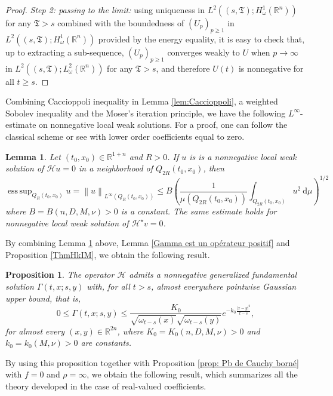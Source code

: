 \documentclass[12pt, letterpaper]{amsart}
\newtheorem{prop}[thm]{Proposition}
\newtheorem{lem}[thm]{Lemma}
\theoremstyle{definition}
\theoremstyle{remark}
\numberwithin{equation}{section}
\DeclareMathOperator*{\supess}{ess\,sup}
\begin{document}
\begin{proof}
\textit{Step 2: passing to the limit:} using uniqueness in $L^2((s,\mathfrak{T});H^1_\omega(\mathbb{R}^n))$ for any $\mathfrak{T}>s$ combined with the boundedness of $(U_p)_{p\ge1}$ in $L^2((s,\mathfrak{T});H^1_\omega(\mathbb{R}^n))$ provided by the energy equality, it is easy to check that, up to extracting a sub-sequence, $(U_p)_{p\ge1} $ converges weakly to $U$ when $p \to \infty$ in $L^2((s,\mathfrak{T});L_\omega^2(\mathbb{R}^n))$ for any $\mathfrak{T}>s$, and therefore $U(t)$ is nonnegative for all $t \geq s$.
\end{proof}
Combining Caccioppoli inequality in Lemma \ref{lem:Caccioppoli}, a weighted Sobolev inequality \cite[Theorem 15.26]{heinonen2018nonlinear} and the Moser's iteration principle, we have the following $L^\infty$-estimate on nonnegative local weak solutions. For a proof, one can follow the classical scheme or see \cite[Proposition 2.1]{ishige1999behavior} with lower order coefficients equal to zero.
\begin{lem}\label{lem: Moser cas reel}
    Let $(t_0, x_0) \in \mathbb{R}^{1+n}$ and $R>0$. If $u$ is is a nonnegative local weak solution of $\mathcal{H}u=0$ in a neighborhood of $Q_{2R}(t_0,x_0)$, then 
    \begin{equation*}
        \supess_{Q_{R}(t_0,x_0)} u = \left\|u \right\|_{L^\infty(Q_R(t_0,x_0))}   \leq B \left ( \frac{1}{\mu(Q_{2R}(t_0,x_0))} \int_{Q_{2R}(t_0,x_0)} u ^2 \ \mathrm d \mu\right  )^{1/2}
    \end{equation*}
    where $B=B(n,D,M,\nu)>0$ is a constant. The same estimate holds for nonnegative local weak solution of $\mathcal{H}^\star v=0$.
\end{lem}
By combining Lemma \ref{lem: Moser cas reel} above, Lemma \ref{Gamma est un opérateur positif} and Proposition \ref{ThmHkIM}, we obtain the following result.
\begin{prop}
The operator $\mathcal{H}$ admits a nonnegative generalized fundamental solution $\Gamma(t,x;s,y)$ with, for all $t>s$, almost everywhere pointwise Gaussian upper bound, that is,
    \begin{equation}\label{1}
      0\leq  \Gamma(t,x;s,y)  \leq  \frac{K_0}{\sqrt{\omega_{t-s}(x)}\sqrt{\omega_{t-s}(y)}} e^{-k_0 \frac{\left | x-y \right |^2}{t-s}},
    \end{equation}
for almost every $(x,y) \in \mathbb{R}^{2n}$, where $K_0=K_0(n,D,M,\nu)>0$ and $k_0=k_0(M,\nu)>0$ are constants.
\end{prop}


By using this proposition together with Proposition \ref{prop: Pb de Cauchy borné} with $f = 0$ and $\rho = \infty$, we obtain the following result, which summarizes all the theory developed in the case of real-valued coefficients.
\end{document}
